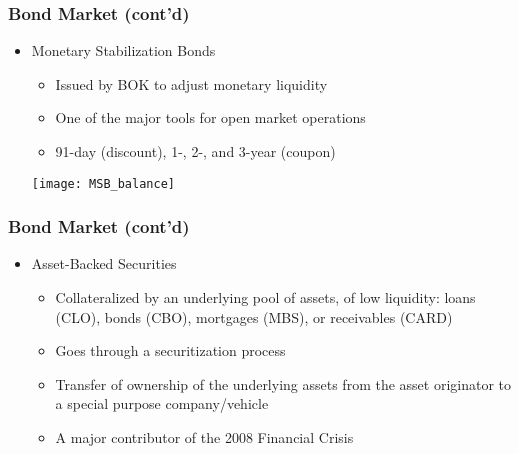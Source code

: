 \documentclass[10pt]{beamer}
\begin{document}
	
	\begin{frame}
		\frametitle{Bond Market (cont'd)}
		
		\begin{itemize}
			\item Monetary Stabilization Bonds
			\begin{itemize}
				\item Issued by BOK to adjust monetary liquidity
				\item One of the major tools for open market operations
				\item 91-day (discount), 1-, 2-, and 3-year (coupon)
			\end{itemize}	
			
			\begin{center}
				\texttt{[image: MSB\_balance]}
			\end{center}
			
		\end{itemize}
		
	\end{frame}
	
	
	
	\begin{frame}
		\frametitle{Bond Market (cont'd)}
		
		\begin{itemize} \vspace{5pt} \itemsep10pt
			\item Asset-Backed Securities
			\begin{itemize} \vspace{5pt} \itemsep10pt
				\item Collateralized by an underlying pool of assets,  of low liquidity:  loans (CLO), bonds (CBO), mortgages (MBS), or receivables (CARD)
				
				\item Goes through a securitization process
				
				\item Transfer of ownership of the underlying assets from the asset originator to a special purpose company/vehicle %
				
				\item A major contributor of the 2008 Financial Crisis
			\end{itemize}	
			
		\end{itemize}
		
	\end{frame}
	
\end{document}
